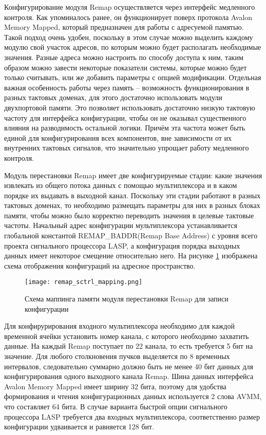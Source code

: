 Конфигурирование модуля Remap осуществляется через интерфейс медленного контроля. Как упоминалось ранее, он функционирует поверх протокола Avalon Memory Mapped, который предназначен для работы с адресуемой памятью. Такой подход очень удобен, поскольку в этом случае можно выделить каждому модулю свой участок адресов, по которым можно будет располагать необходимые значения. Разные адреса можно настроить по способу доступа к ним, таким образом можно завести некоторые показатели системы, которые можно будет только считывать, или же добавить параметры с опцией модификации. Отдельная важная особенность работы через память -- возможность функционирования в разных тактовых доменах, для этого достаточно использовать модули двухпортовой памяти. Это позволяет использовать достаточно низкую тактовую частоту для интерфейса конфигурации, чтобы он не оказывал существенного влияния на разводимость остальной логики. Причём эта частота может быть единой для конфигурирования всех компонентов, вне зависимости от их внутренних тактовых сигналов, что значительно упрощает работу медленного контроля.\par
Модуль перестановки Remap имеет две конфигурируемые стадии: какие значения извлекать из общего потока данных с помощью мультиплексора и в каком порядке их выдавать в выходной канал. Поскольку эти стадии работают в разных тактовых доменах, то необходимо размещать параметры для них в разных блоках памяти, чтобы можно было корректно переводить значения в целевые тактовые частоты. Начальный адрес конфигурации мультиплексора устанавливается глобальной константой REMAP\_BADDR(Remap Base Address) с уровня всего проекта сигнального процессора LASP, а конфигурация порядка выходных данных имеет некоторое смещение относительно него. На рисунке \ref{fig:remap_sctrl_mapping} изображена схема отображения конфигураций на адресное пространство.\par
\begin{figure}[ht]
    \centering
    \texttt{[image: remap\_sctrl\_mapping.png]}
    \caption{Схема маппинга памяти модуля перестановки Remap для записи конфигурации}
    \label{fig:remap_sctrl_mapping}
\end{figure}\par
Для конфирурирования входного мультиплексора необходимо для каждой временной ячейки установить номер канала, с которого необходимо захватить данные. На каждый Remap поступает по 22 канала, то есть требуется 5 бит на значение. Для любого столкновения пучков выделяется по 8 временных интервалов, следовательно суммарно должно быть не менее 40 бит данных для конфигурирования одного выходного канала Remap. Шина данных интерфейса Avalon Memory Mapped имеет ширину 32 бита, поэтому для удобства формирования и чтения конфигурационных данных используется 2 слова AVMM, что составляет 64 бита. В случае варианта быстрой опции сигнального процессора LASP требуется два входных мультиплексора, соответственно размер конфигурации удваивается и равняется 128 бит.\par
